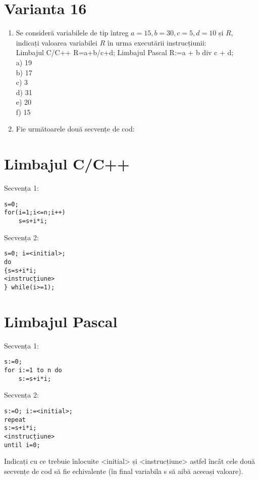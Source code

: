 \section*{Varianta 16}
\begin{enumerate}
  \item Se consideră variabilele de tip întreg $a=15, b=30, c=5, d=10$ și $R$, indicați valoarea variabilei $R$ în urma executării instrucțiunii:\\
Limbajul C/C++ R=a+b/c+d; Limbajul Pascal R:=a + b div c + d;\\
a) 19\\
b) 17\\
c) 3\\
d) 31\\
e) 20\\
f) 15
  \item Fie următoarele două secvențe de cod:
\end{enumerate}

\section*{Limbajul C/C++}
Secvența 1:

\begin{verbatim}
s=0;
for(i=1;i<=n;i++)
    s=s+i*i;
\end{verbatim}

Secvența 2:

\begin{verbatim}
s=0; i=<initial>;
do
{s=s+i*i;
<instrucțiune>
} while(i>=1);
\end{verbatim}

\section*{Limbajul Pascal}
Secvența 1:

\begin{verbatim}
s:=0;
for i:=1 to n do
    s:=s+i*i;
\end{verbatim}

Secvența 2:

\begin{verbatim}
s:=O; i:=<initial>;
repeat
s:=s+i*i;
<instrucțiune>
until i=0;
\end{verbatim}

Indicați cu ce trebuie înlocuite <initial> și <instrucțiune> astfel încât cele două secvențe de cod să fie echivalente (în final variabila s să aibă aceeași valoare).


